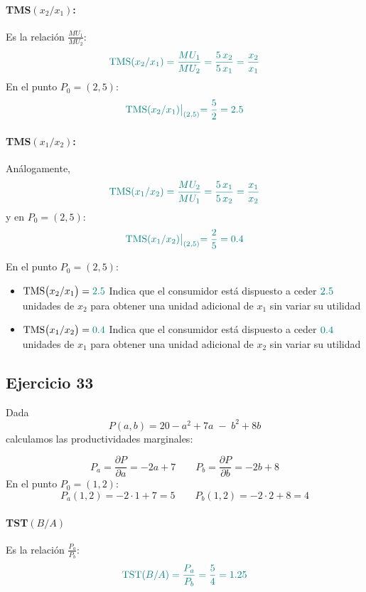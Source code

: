\documentclass{article}
\begin{document}
\paragraph{TMS\((x_2/x_1)\):}  
Es la relación \(\frac{MU_{1}}{MU_{2}}\):
\[
\color{teal}
\mathrm{TMS}(x_2/x_1)
=\frac{MU_{1}}{MU_{2}}
=\frac{5\,x_2}{5\,x_1}
=\frac{x_2}{x_1}
\]
En el punto \(P_0=(2,5)\):
\[
\color{teal}
\mathrm{TMS}(x_2/x_1)\bigl|_{(2,5)}
=\frac{5}{2}=2.5
\]

\paragraph{TMS\((x_1/x_2)\):}  
Análogamente,
\[
\color{teal}
\mathrm{TMS}(x_1/x_2)
=\frac{MU_{2}}{MU_{1}}
=\frac{5\,x_1}{5\,x_2}
=\frac{x_1}{x_2}
\]
y en \(P_0=(2,5)\):
\[
\color{teal}
\mathrm{TMS}(x_1/x_2)\bigl|_{(2,5)}
=\frac{2}{5}=0.4
\]

En el punto \(P_0=(2,5)\):

\begin{itemize}
  \item \(\displaystyle \mathrm{TMS}\bigl(x_2/x_1\bigr) = \color{teal} 2.5\)  
    Indica que el consumidor está dispuesto a ceder \(\color{teal} 2.5\) unidades de \(x_2\) para obtener una unidad adicional de \(x_1\) sin variar su utilidad

  \item \(\displaystyle \mathrm{TMS}\bigl(x_1/x_2\bigr) = \color{teal} 0.4\)  
    Indica que el consumidor está dispuesto a ceder \(\color{teal} 0.4\) unidades de \(x_1\) para obtener una unidad adicional de \(x_2\) sin variar su utilidad
\end{itemize}



\newpage

\subsection{Ejercicio 33}
Dada
\[
P(a,b) = 20 - a^2 + 7a \;-\; b^2 + 8b
\]
calculamos las productividades marginales:

\[
P_a = \frac{\partial P}{\partial a} = -2a + 7
\qquad
P_b = \frac{\partial P}{\partial b} = -2b + 8
\]
En el punto \(P_0=(1,2)\):
\[
P_a(1,2) = -2\cdot1 + 7 = 5
\qquad
P_b(1,2) = -2\cdot2 + 8 = 4
\]

\paragraph{TST\((B/A)\)}  
Es la relación \(\frac{P_a}{P_b}\):
\[
\color{teal}
\mathrm{TST}(B/A)
= \frac{P_a}{P_b}
= \frac{5}{4}
= 1.25
\]
\end{document}
